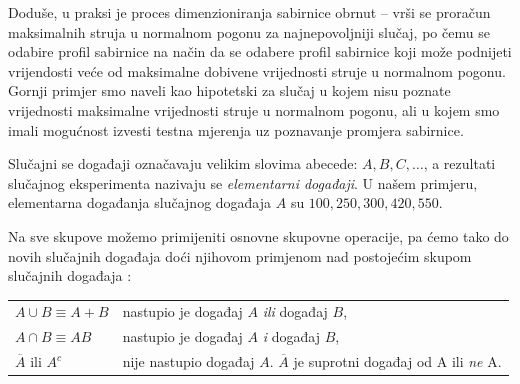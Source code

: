 \documentclass[a4paper,12pt,oneside]{memoir}
\begin{document}
            Doduše, u praksi je proces dimenzioniranja sabirnice obrnut -- vrši se proračun maksimalnih struja u normalnom pogonu za najnepovoljniji slučaj, po čemu se odabire profil sabirnice na način da se odabere profil sabirnice koji može podnijeti vrijendosti veće od maksimalne dobivene vrijednosti struje u normalnom pogonu. Gornji primjer smo naveli kao hipotetski za slučaj u kojem nisu poznate vrijednosti maksimalne vrijednosti struje u normalnom pogonu, ali u kojem smo imali mogućnost izvesti testna mjerenja uz poznavanje promjera sabirnice.

            Slučajni se događaji označavaju velikim slovima abecede: $A,B,C,\ldots$, a rezultati slučajnog eksperimenta nazivaju se \textit{elementarni događaji}. U našem primjeru, elementarna događanja slučajnog događaja $A$ su $100,250,300,420,550$.

            Na sve skupove možemo primijeniti osnovne skupovne operacije, pa ćemo tako do novih slučajnih događaja doći njihovom primjenom nad postojećim skupom slučajnih događaja \cite{Bahovec}:

            \begin{table}[H]
                \centering
                \begin{tabular*}{0.9\textwidth}{l p{13cm}}
                    \textit{$A\cup B\equiv A+B$} & nastupio je događaj $A$ \textit{ili} događaj $B$,\\
                    \textit{$A\cap B\equiv AB$} & nastupio je događaj $A$ \textit{i} događaj $B$,\\
                    \textit{$\overline{A}$} ili \textit{$A^c$} & nije nastupio događaj $A$. $\overline{A}$ je suprotni događaj od A ili \textit{ne} A.\\
                \end{tabular*}
            \end{table}
\end{document}
